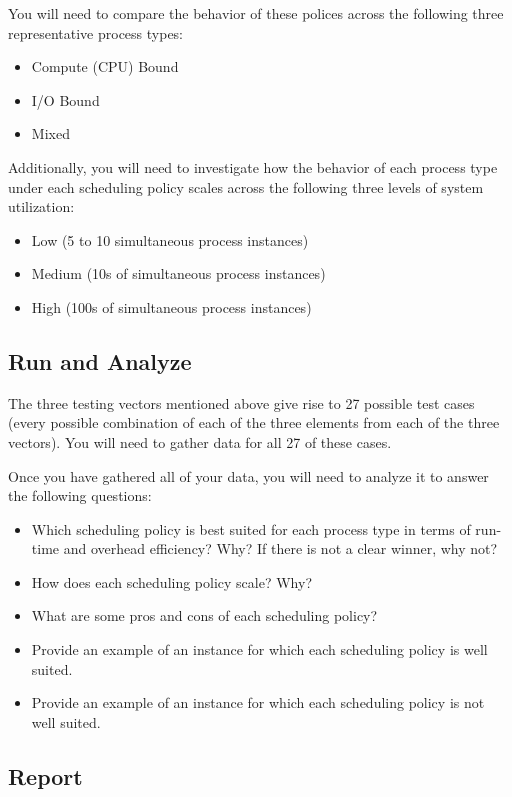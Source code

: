 \documentclass[12pt]{article}
\begin{document}
You will need to compare the behavior of these polices across the
following three representative process types:

\begin{itemize}
\item Compute (CPU) Bound
\item I/O Bound
\item Mixed
\end{itemize}

Additionally, you will need to investigate how the behavior of each
process type under each scheduling policy scales across the following
three levels of system utilization:

\begin{itemize}
\item Low (5 to 10 simultaneous process instances)
\item Medium (10s of simultaneous process instances)
\item High (100s of simultaneous process instances)
\end{itemize}

\subsection{Run and Analyze}

The three testing vectors mentioned above give rise to 27 possible
test cases (every possible combination of each of the three elements
from each of the three vectors). You will need to gather data for all
27 of these cases.

Once you have gathered all of your data, you will need to analyze it
to answer the following questions:

\begin{itemize}
\item Which scheduling policy is best suited for each process type in
  terms of run-time and overhead efficiency?
  Why? If there is not a clear winner, why not?
\item How does each scheduling policy scale? Why?
\item What are some pros and cons of each scheduling policy?
\item Provide an example of an instance for which each scheduling
  policy is well suited.
\item Provide an example of an instance for which each scheduling
  policy is not well suited.
\end{itemize}

\subsection{Report}
\end{document}
